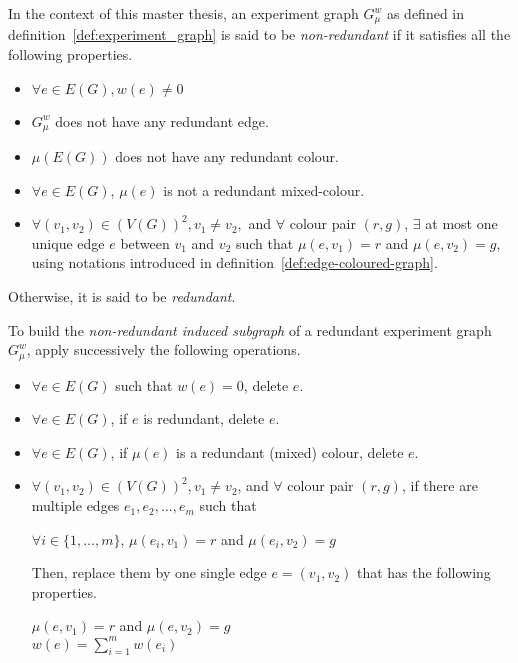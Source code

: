 \begin{definition}
    \label{def:redundant-experiment-graph}
    In the context of this master thesis, an experiment graph $G_\mu^w$ as defined in definition~\ref{def:experiment_graph} is said to be \textit{non-redundant} if it satisfies all the following properties.

    \begin{itemize}
        \item $\forall e \in E(G), w(e) \neq 0$
        \item $G_\mu^w$ does not have any redundant edge.
        \item $\mu\left(E(G)\right)$ does not have any redundant colour.
        \item $\forall e \in E(G)$, $\mu(e)$ is not a redundant mixed-colour.
        \item $\forall (v_1, v_2) \in (V(G))^2, v_1 \neq v_2,$ and $\forall$ colour pair $(r, g)$, $\exists$ at most one unique edge $e$ between $v_1$ and $v_2$ such that $\mu(e, v_1) = r$ and $\mu(e, v_2) = g$, using notations introduced in definition~\ref{def:edge-coloured-graph}.
    \end{itemize}

    Otherwise, it is said to be \textit{redundant}.
\end{definition}

To build the \textit{non-redundant induced subgraph} of a redundant experiment graph $G_\mu^w$, apply successively the following operations.

\begin{itemize}
    \item $\forall e \in E(G)$ such that $w(e) = 0$, delete $e$.
    \item $\forall e \in E(G)$, if $e$ is redundant, delete $e$.
    \item $\forall e \in E(G)$, if $\mu(e)$ is a redundant (mixed) colour, delete $e$.
    \item $\forall (v_1, v_2) \in (V(G))^2, v_1 \neq v_2$, and $\forall$ colour pair $(r, g)$, if there are multiple edges $e_1, e_2, \dots, e_m$ such that

        \begin{center}
            $\forall i \in \{1, \dots, m\}$, $\mu(e_i, v_1) = r$ and $\mu(e_i, v_2) = g$
        \end{center}

        Then, replace them by one single edge $e = (v_1, v_2)$ that has the following properties.

        \begin{center}
            $\mu(e, v_1) = r$ and $\mu(e, v_2) = g$ \\
            $w(e) = \sum\limits_{i = 1}^m w(e_i)$
        \end{center}

\end{itemize}

